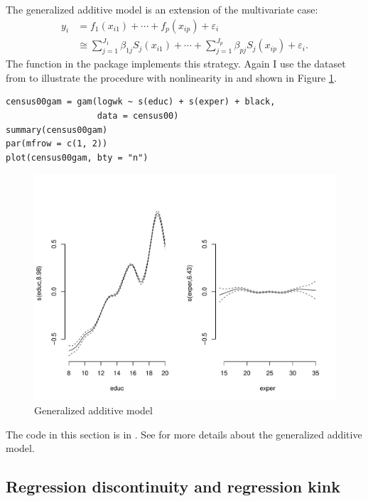 The generalized additive model is an extension of the multivariate case: 
\begin{align*}
y_{i} & =f_{1}(x_{i1})+\cdots+f_{p}(x_{ip})+\varepsilon_{i}\\
 & \cong\sum_{j=1}^{J_{1}}\beta_{1j}S_{j}(x_{i1})+\cdots+\sum_{j=1}^{J_{p}}\beta_{pj}S_{j}(x_{ip})+\varepsilon_{i}.
\end{align*}
The  function in the  package implements this strategy. Again I use the dataset from \citet{angrist2006quantile} to illustrate the procedure with nonlinearity in  and  shown in Figure \ref{fig::gam-wage}. 




\begin{lstlisting}
census00gam = gam(logwk ~ s(educ) + s(exper) + black, 
                  data = census00) 
summary(census00gam)
par(mfrow = c(1, 2))
plot(census00gam, bty = "n")
\end{lstlisting}

\begin{figure}
\centering 
\includegraphics[width =  \textwidth]{figures/gam_wage.pdf}
\caption{Generalized additive model}\label{fig::gam-wage}
\end{figure}

The  code in this section is in . See \citet{wood2017generalized} for more details about the generalized additive model.



\subsection{Regression discontinuity and regression kink}


